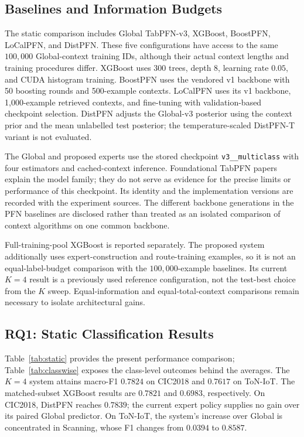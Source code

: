 \documentclass[sigconf,anonymous,pbalance]{acmart}
\begin{document}
\subsection{Baselines and Information Budgets}
The static comparison includes Global TabPFN-v3, XGBoost, BoostPFN, LoCalPFN, and DistPFN. These five configurations have access to the same $100{,}000$ Global-context training IDs, although their actual context lengths and training procedures differ. XGBoost uses 300 trees, depth 8, learning rate $0.05$, and CUDA histogram training. BoostPFN uses the vendored v1 backbone with 50 boosting rounds and 500-example contexts. LoCalPFN uses its v1 backbone, 1,000-example retrieved contexts, and fine-tuning with validation-based checkpoint selection. DistPFN adjusts the Global-v3 posterior using the context prior and the mean unlabelled test posterior; the temperature-scaled DistPFN-T variant is not evaluated.

The Global and proposed experts use the stored checkpoint \texttt{v3\_\_\allowbreak multiclass} with four estimators and cached-context inference. Foundational TabPFN papers explain the model family; they do not serve as evidence for the precise limits or performance of this checkpoint. Its identity and the implementation versions are recorded with the experiment sources. The different backbone generations in the PFN baselines are disclosed rather than treated as an isolated comparison of context algorithms on one common backbone.

Full-training-pool XGBoost is reported separately. The proposed system additionally uses expert-construction and route-training examples, so it is not an equal-label-budget comparison with the $100{,}000$-example baselines. Its current $K=4$ result is a previously used reference configuration, not the test-best choice from the $K$ sweep. Equal-information and equal-total-context comparisons remain necessary to isolate architectural gains.

\subsection{RQ1: Static Classification Results}


Table~\ref{tab:static} provides the present performance comparison; Table~\ref{tab:classwise} exposes the class-level outcomes behind the averages. The $K=4$ system attains macro-F1 $0.7824$ on CIC2018 and $0.7617$ on ToN-IoT. The matched-subset XGBoost results are $0.7821$ and $0.6983$, respectively. On CIC2018, DistPFN reaches $0.7839$; the current expert policy supplies no gain over its paired Global predictor. On ToN-IoT, the system's increase over Global is concentrated in Scanning, whose F1 changes from $0.0394$ to $0.8587$.
\end{document}
